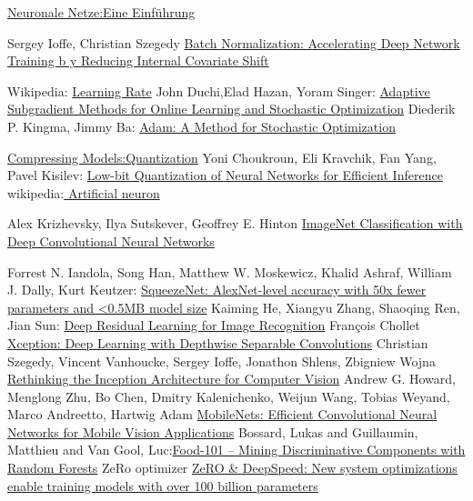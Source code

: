 \documentclass[12pt,a4paper]{scrartcl}
\numberwithin{equation}{section}
\begin{document}
\begin{thebibliography}{lem00}
 	\href{http://www.neuronalesnetz.de/aktivitaet.html}{Neuronale Netze:Eine Einführung}
 	
	Sergey Ioffe, Christian Szegedy
 	\href{https://arxiv.org/pdf/1502.03167.pdf}{Batch Normalization: Accelerating Deep Network Training b
 		y
 		Reducing Internal Covariate Shift}

Wikipedia:
		\href{https://en.wikipedia.org/wiki/Learning_rate}{Learning Rate}
		John Duchi,Elad Hazan, Yoram Singer:
		\href{http://www.jmlr.org/papers/volume12/duchi11a/duchi11a.pdf}{Adaptive Subgradient Methods for
			Online Learning and Stochastic Optimization}
		Diederik P. Kingma, Jimmy Ba:
		\href{https://arxiv.org/abs/1412.6980}{Adam: A Method for Stochastic Optimization}
		
		\href{https://nervanasystems.github.io/distiller/quantization.html}{Compressing Models:Quantization}
		Yoni Choukroun, Eli Kravchik, Fan Yang, Pavel Kisilev:
			\href{https://arxiv.org/abs/1902.06822}{Low-bit Quantization of Neural Networks for Efficient Inference}
	wikipedia:\href{https://en.wikipedia.org/wiki/Artificial_neuron}{ Artificial neuron}
	
Alex Krizhevsky, Ilya Sutskever, Geoffrey E. Hinton
		\href{https://papers.nips.cc/paper/4824-imagenet-classification-with-deep-convolutional-neural-networks.pdf}{ImageNet Classification with Deep Convolutional Neural Networks}
  
  	Forrest N. Iandola, Song Han, Matthew W. Moskewicz, Khalid Ashraf, William J. Dally, Kurt Keutzer:
  	\href{https://arxiv.org/abs/1602.07360}{SqueezeNet: AlexNet-level accuracy with 50x fewer parameters and <0.5MB model size}
  		Kaiming He, Xiangyu Zhang, Shaoqing Ren, Jian Sun:
  		\href{https://arxiv.org/pdf/1512.03385.pdf}{Deep Residual Learning for Image Recognition}
  			François Chollet
  		\href{https://arxiv.org/abs/1610.02357}{Xception: Deep Learning with Depthwise Separable Convolutions}
 Christian Szegedy, Vincent Vanhoucke, Sergey Ioffe, Jonathon Shlens, Zbigniew Wojna
  			\href{https://arxiv.org/abs/1512.00567}{Rethinking the Inception Architecture for Computer Vision}
			Andrew G. Howard, Menglong Zhu, Bo Chen, Dmitry Kalenichenko, Weijun Wang, Tobias Weyand, Marco Andreetto, Hartwig Adam \href{https://arxiv.org/abs/1704.04861}{MobileNets: Efficient Convolutional Neural Networks for Mobile Vision Applications}
			Bossard, Lukas and Guillaumin, Matthieu and Van Gool, Luc:\href{https://www.vision.ee.ethz.ch/datasets_extra/food-101/}{Food-101 -- Mining Discriminative Components with Random Forests}
	ZeRo optimizer
	\href{https://www.microsoft.com/en-us/research/blog/zero-deepspeed-new-system-optimizations-enable-training-models-with-over-100-billion-parameters/}{ZeRO \& DeepSpeed: New system optimizations enable training models with over 100 billion parameters}
\end{thebibliography}

\newpage
  
 \thispagestyle{empty}




\listoffigures
\end{document}

